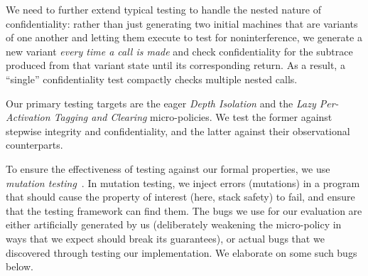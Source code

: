 \documentclass[10pt,conference]{ieeetran}%
\theoremstyle{definition}
\begin{document}
{%
%
%
%
We need to further extend typical testing to handle the nested
nature of confidentiality: rather than just generating two
initial machines that are variants of one another and letting them
execute to test for noninterference, we generate a new variant
{\em every time a call is made} and check confidentiality for the
subtrace produced from that variant state until its corresponding
return. As a result, a ``single'' confidentiality test compactly
checks multiple nested calls.

Our primary testing targets are the eager {\em Depth Isolation}
and the {\em Lazy Per-Activation Tagging and Clearing} micro-policies.
We test the former against stepwise integrity and confidentiality, and
the latter against their observational counterparts.

To ensure the effectiveness of testing against our formal properties, we
use {\em mutation testing}~\cite{JiaH11}. In mutation testing, we inject errors
(mutations) in a program that should cause the property of interest (here,
stack safety) to fail, and ensure that the testing framework can find
them. The bugs we use for our evaluation are either artificially generated
by us (deliberately weakening the micro-policy in ways that we expect
should break its guarantees), or actual bugs that we discovered through
testing our implementation. We elaborate on some such bugs below.

}
\end{document}
